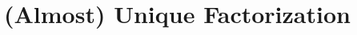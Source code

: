 \documentclass[../notes.tex]{subfiles}
\begin{document}
\section{(Almost) Unique Factorization} \label{sec:upf}
\end{document}

